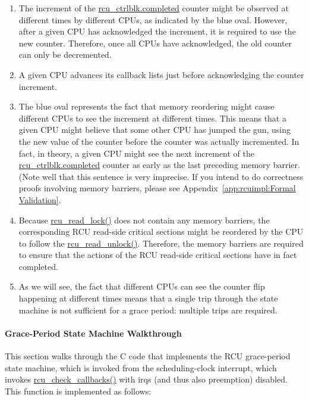 \begin{enumerate}
\item	The increment of the \url{rcu_ctrlblk.completed} counter
	might be observed at different times by different CPUs, as
	indicated by the blue oval.  However, after a given
	CPU has acknowledged the increment, it is required to
	use the new counter.
	Therefore, once all CPUs have acknowledged, the old counter
	can only be decremented.
\item	A given CPU advances its callback lists just before
	acknowledging the counter increment.
\item	The blue oval represents the fact that memory reordering
	might cause different CPUs to see the increment at
	different times.
	This means that a given CPU might believe that some
	other CPU has jumped the gun, using the new value of the counter
	before the counter was actually incremented.
	In fact, in theory, a given CPU might see the next increment of the
	\url{rcu_ctrlblk.completed} counter as early as
	the last preceding memory barrier.
	(Note well that this sentence is very imprecise.
	If you intend to do correctness proofs involving memory barriers,
	please see Appendix~\ref{app:rcuimpl:Formal Validation}.
\item	Because \url{rcu_read_lock()} does not contain any
	memory barriers, the corresponding RCU read-side critical
	sections might be reordered by the CPU to follow the
	\url{rcu_read_unlock()}.
	Therefore, the memory barriers are required to ensure
	that the actions of the RCU read-side critical sections
	have in fact completed.
\item	As we will see, the fact that different CPUs can see the
	counter flip happening at different times means that a
	single trip through the state machine is not sufficient
	for a grace period: multiple trips are required.
\end{enumerate}

\paragraph{Grace-Period State Machine Walkthrough}
\label{app:rcuimpl:Grace-Period State Machine Walkthrough}

This section walks through the C code that implements the RCU
grace-period state machine, which is invoked from the scheduling-clock
interrupt, which invokes \url{rcu_check_callbacks()} with
irqs (and thus also preemption) disabled.
This function is implemented as follows:

